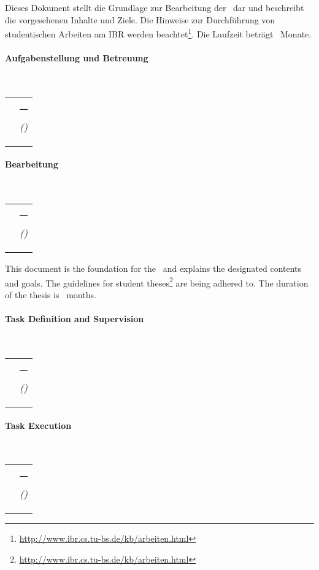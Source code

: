 \noindent
\ifgerman
	Dieses Dokument stellt die Grundlage zur Bearbeitung der \thesistype~dar und beschreibt
	die vorgesehenen Inhalte und Ziele.
	Die Hinweise zur Durchführung von studentischen Arbeiten am IBR werden
	beachtet\footnote{\url{http://www.ibr.cs.tu-bs.de/kb/arbeiten.html}}.
	Die Laufzeit beträgt \duration~Monate.
	\vspace*{10mm}
	\paragraph{Aufgabenstellung und Betreuung}\hfill\\[3ex]
	\noindent
	\begin{tabularx}{\textwidth}{@{}XX}
	\supervisoronesign
	\supervisortwosign
	\supervisorthreesign
	\professor          & \rule[-0.5ex]{\linewidth}{1pt}\newline\itshape(\ibrsignature)
	\end{tabularx}
	\vspace*{10mm}
	\paragraph{Bearbeitung}\hfill\\[3ex]
	\noindent
	\begin{tabularx}{\textwidth}{@{}XX}
	\name       & \rule[-0.5ex]{\linewidth}{1pt}\newline\itshape(\ibrsignature)
	\end{tabularx}
\else
	This document is the foundation for the \thesistype~and explains the designated contents and goals.
	The guidelines for student theses\footnote{\url{http://www.ibr.cs.tu-bs.de/kb/arbeiten.html}} are being adhered to.
	The duration of the thesis is \duration~months.
	\paragraph{Task Definition and Supervision}\hfill\\[3ex]
	\noindent
	\begin{tabularx}{\textwidth}{@{}XX}
	\supervisoronesign
	\supervisortwosign
	\supervisorthreesign
	\professor          & \rule[-0.5ex]{\linewidth}{1pt}\newline\itshape(\ibrsignature)
	\end{tabularx}
	\vspace*{10mm}
	\paragraph{Task Execution}\hfill\\[3ex]
	\noindent
	\begin{tabularx}{\textwidth}{@{}XX}
	\name       & \rule[-0.5ex]{\linewidth}{1pt}\newline\itshape(\ibrsignature)
	\end{tabularx}
\fi
